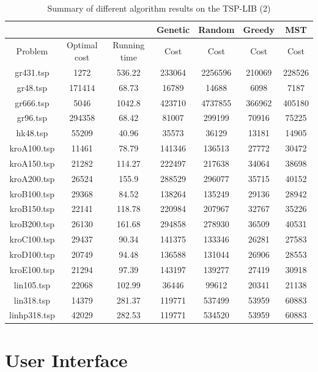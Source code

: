 \documentclass[11pt, english]{article}
\begin{document}
\begin{table}[H]
	\centering
	\begin{tabular}{|c|c|c|c|c|c|c|}
		\hline
		 &  &  & Genetic & Random & Greedy  & MST \\
		\hline
		\hline
		Problem & Optimal cost & Running time & Cost & Cost & Cost & Cost \\
		\hline	
		gr431.tsp & 1272 & 536.22 & 233064 & 2256596 & 210069 & 228526 \\
		gr48.tsp & 171414 & 68.73 & 16789 & 14688 & 6098 & 7187 \\
		gr666.tsp & 5046 & 1042.8 & 423710 & 4737855 & 366962 & 405180 \\
		gr96.tsp & 294358 & 68.42 & 81007 & 299199 & 70916 & 75225 \\
		hk48.tsp & 55209 & 40.96 & 35573 & 36129 & 13181 & 14905 \\
		kroA100.tsp & 11461 & 78.79 & 141346 & 136513 & 27772 & 30472 \\
		kroA150.tsp & 21282 & 114.27 & 222497 & 217638 & 34064 & 38698 \\
		kroA200.tsp & 26524 & 155.9 & 288529 & 296077 & 35715 & 40152 \\
		kroB100.tsp & 29368 & 84.52 & 138264 & 135249 & 29136 & 28942 \\
		kroB150.tsp & 22141 & 118.78 & 220984 & 207967 & 32767 & 35226 \\
		kroB200.tsp & 26130 & 161.68 & 294858 & 278930 & 36509 & 40531 \\
		kroC100.tsp & 29437 & 90.34 & 141375 & 133346 & 26281 & 27583 \\
		kroD100.tsp & 20749 & 94.48 & 136588 & 131044 & 26906 & 28553 \\
		kroE100.tsp & 21294 & 97.39 & 143197 & 139277 & 27419 & 30918 \\
		lin105.tsp & 22068 & 102.99 & 36446 & 99612 & 20341 & 21138 \\
		lin318.tsp & 14379 & 281.37 & 119771 & 537499 & 53959 & 60883 \\
		linhp318.tsp & 42029 & 282.53 & 119771 & 534520 & 53959 & 60883 \\
	    \hline
	\end{tabular}
	\caption{Summary of different algorithm results on the TSP-LIB (2)}
	\label{table:allalgo_table2}
\end{table}


\newpage
\section{User Interface}
\end{document}
